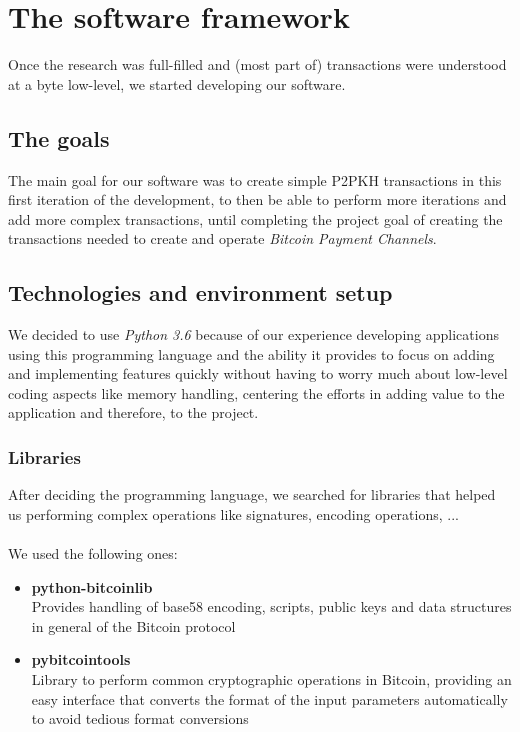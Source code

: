 \chapter*{The software framework}
\label{chap:software_framework}
Once the research was full-filled and (most part of) transactions were understood at a byte low-level, we started developing our software. 
\section{The goals}
The main goal for our software was to create simple P2PKH transactions in this first iteration of the development, to then be able to perform more iterations and add more complex transactions, until completing the project goal of creating the transactions needed to create and operate \textit{Bitcoin Payment Channels}.
\section{Technologies and environment setup}
We decided to use \textit{Python 3.6} because of our experience developing applications using this programming language and the ability it provides to focus on adding and implementing features quickly without having to worry much about low-level coding aspects like memory handling, centering the efforts in adding value to the application and therefore, to the project.

\subsection{Libraries}
After deciding the programming language, we searched for libraries that helped us performing complex operations like signatures, encoding operations, ...\\\\
We used the following ones:
\begin{itemize}
    \item \textbf{python-bitcoinlib\cite{python-bitcoinlib:online}}\\
    Provides handling of base58 encoding, scripts, public keys and data structures in general of the Bitcoin protocol
    \item \textbf{pybitcointools\cite{pybitcointools:online}}\\
    Library to perform common cryptographic operations in Bitcoin, providing an easy interface that converts the format of the input parameters automatically to avoid tedious format conversions
\end{itemize}

